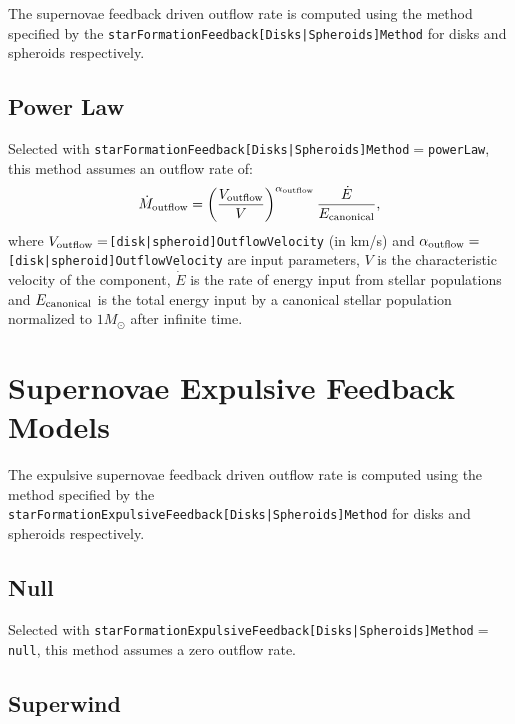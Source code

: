 The supernovae feedback driven outflow rate is computed using the method specified by the {\tt starFormationFeedback[Disks|Spheroids]Method} for disks and spheroids respectively.

\subsection{Power Law}

Selected with {\tt starFormationFeedback[Disks|Spheroids]Method}$=${\tt powerLaw}, this method assumes an outflow rate of:
\begin{equation}
 \dot{M}_{\rm outflow} = \left({V_{\rm outflow} \over V}\right)^{\alpha_{\rm outflow}} {\dot{E} \over E_{\rm canonical}},
\end{equation}
where $V_{\rm outflow}=${\tt [disk|spheroid]OutflowVelocity} (in km/s) and $\alpha_{\rm outflow}=${\tt [disk|spheroid]OutflowVelocity} are input parameters, $V$ is the characteristic velocity of the component, $\dot{E}$ is the rate of energy input from stellar populations and $E_{\rm canonical}$ is the total energy input by a canonical stellar population normalized to $1 M_\odot$ after infinite time.

\section{Supernovae Expulsive Feedback Models}\label{sec:sneExpulsiveFeedback}

The expulsive supernovae feedback driven outflow rate is computed using the method specified by the {\tt starFormationExpulsiveFeedback[Disks|Spheroids]Method} for disks and spheroids respectively.

\subsection{Null}

Selected with {\tt starFormationExpulsiveFeedback[Disks|Spheroids]Method}$=${\tt null}, this method assumes a zero outflow rate.

\subsection{Superwind}

